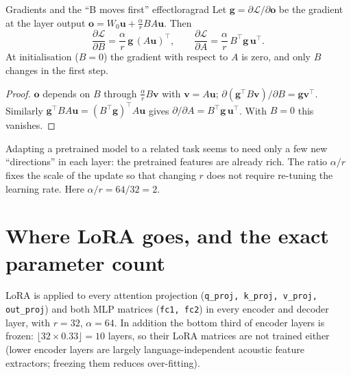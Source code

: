 \begin{proposition}{Gradients and the ``B moves first'' effect}{loragrad}
Let $\bm g=\partial\mathcal L/\partial\bm o$ be the gradient at the layer output $\bm o=W_0\bm u+\frac\alpha rBA\bm u$. Then
\[
\frac{\partial\mathcal L}{\partial B}=\frac\alpha r\,\bm g\,(A\bm u)^\top,\qquad
\frac{\partial\mathcal L}{\partial A}=\frac\alpha r\,B^\top\bm g\,\bm u^\top .
\]
At initialisation ($B=0$) the gradient with respect to $A$ is zero, and only $B$ changes in the first step.
\end{proposition}
\begin{proof}
$\bm o$ depends on $B$ through $\frac\alpha r B\bm v$ with $\bm v=A\bm u$; $\partial(\bm g^\top B\bm v)/\partial B=\bm g\bm v^\top$.
Similarly $\bm g^\top BA\bm u=(B^\top\bm g)^\top A\bm u$ gives $\partial/\partial A=B^\top\bm g\,\bm u^\top$. With $B=0$ this vanishes.
\end{proof}

\begin{intuition}
Adapting a pretrained model to a related task seems to need only a few new ``directions'' in each layer: the pretrained features are
already rich. The ratio $\alpha/r$ fixes the scale of the update so that changing $r$ does not require re-tuning the learning rate.
Here $\alpha/r=64/32=2$.
\end{intuition}

\section{Where LoRA goes, and the exact parameter count}

LoRA is applied to every attention projection (\texttt{q\_proj, k\_proj, v\_proj, out\_proj}) and both MLP matrices (\texttt{fc1,
fc2}) in every encoder and decoder layer, with $r=32$, $\alpha=64$. In addition the bottom third of encoder layers is frozen:
$\lfloor 32\times0.33\rfloor=10$ layers, so their LoRA matrices are not trained either (lower encoder layers are largely
language-independent acoustic feature extractors; freezing them reduces over-fitting).

